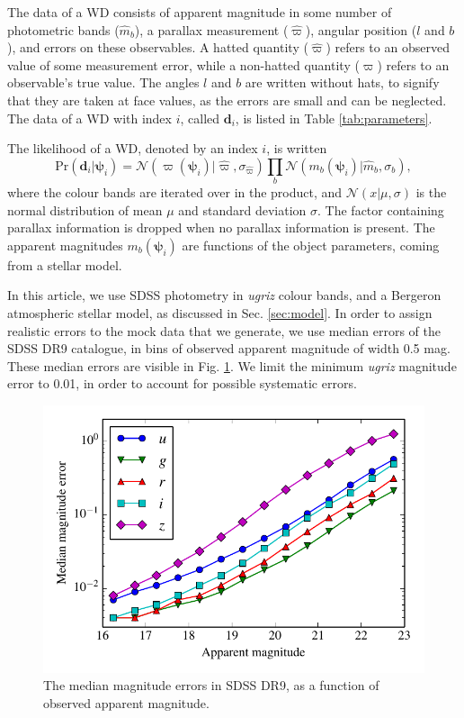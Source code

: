 \documentclass[fleqn,usenatbib]{mnras}
\newcommand{\objp}{\boldsymbol{\psi}}
\newcommand{\data}{\mathbf{d}}
\newcommand{\pr}{\text{Pr}}
\begin{document}
The data of a WD consists of apparent magnitude in some number of photometric bands ($\hat{m}_b$), a parallax measurement ($\hat{\varpi}$), angular position ($l$ and $b$), and errors on these observables. A hatted quantity ($\hat{\varpi}$) refers to an observed value of some measurement error, while a non-hatted quantity ($\varpi$) refers to an observable's true value. The angles $l$ and $b$ are written without hats, to signify that they are taken at face values, as the errors are small and can be neglected. The data of a WD with index $i$, called $\data_i$, is listed in Table \ref{tab:parameters}.

The likelihood of a WD, denoted by an index $i$, is written
\begin{equation}\label{eq:likelihood}
	\pr(\data_i | \objp_i) = \mathcal{N}(\varpi(\objp_i)|\hat{\varpi},\sigma_{\hat{\varpi}})\prod_{b} \mathcal{N}(m_b(\objp_i)|\hat{m}_b,\sigma_b),
\end{equation}
where the colour bands are iterated over in the product, and $\mathcal{N}(x | \mu,\sigma)$ is the normal distribution of mean $\mu$ and standard deviation $\sigma$. The factor containing parallax information is dropped when no parallax information is present. The apparent magnitudes $m_b(\objp_i)$ are functions of the object parameters, coming from a stellar model.

In this article, we use SDSS photometry in \emph{ugriz} colour bands, and a Bergeron atmospheric stellar model, as discussed in Sec. \ref{sec:model}. In order to assign realistic errors to the mock data that we generate, we use median errors of the SDSS DR9 catalogue, in bins of observed apparent magnitude of width 0.5 mag. These median errors are visible in Fig. \ref{fig:magnitude_error}. We limit the minimum \emph{ugriz} magnitude error to 0.01, in order to account for possible systematic errors.

\begin{figure}
	\includegraphics[width=\columnwidth]{median_app_errors.pdf}
    \caption{The median magnitude errors in SDSS DR9, as a function of observed apparent magnitude.}
    \label{fig:magnitude_error}
\end{figure}
\end{document}

